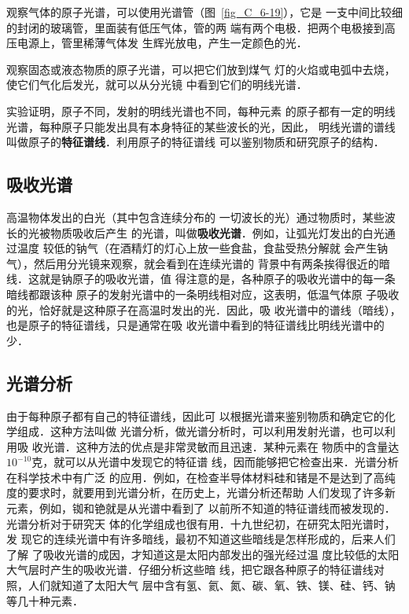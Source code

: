 观察气体的原子光谱，可以使用光谱管（图~\ref{fig_C_6-19}），它是
一支中间比较细的封闭的玻璃管，里面装有低压气体，管的两
端有两个电极．把两个电极接到高压电源上，管里稀薄气体发
生辉光放电，产生一定颜色的光．

观察固态或液态物质的原子光谱，可以把它们放到煤气
灯的火焰或电弧中去烧，使它们气化后发光，就可以从分光镜
中看到它们的明线光谱．

实验证明，原子不同，发射的明线光谱也不同，每种元素
的原子都有一定的明线光谱，每种原子只能发出具有本身特征的某些波长的光，因此，
明线光谱的谱线叫做原子的\textbf{特征谱线}．利用原子的特征谱线
可以鉴别物质和研究原子的结构．

\subsection{吸收光谱}
高温物体发出的白光（其中包含连续分布的
一切波长的光）通过物质时，某些波长的光被物质吸收后产生
的光谱，叫做\textbf{吸收光谱}．例如，让弧光灯发出的白光通过温度
较低的钠气（在酒精灯的灯心上放一些食盐，食盐受热分解就
会产生钠气），然后用分光镜来观察，就会看到在连续光谱的
背景中有两条挨得很近的暗线．这就是钠原子的吸收光谱，值
得注意的是，各种原子的吸收光谱中的每一条暗线都跟该种
原子的发射光谱中的一条明线相对应，这表明，低温气体原
子吸收的光，恰好就是这种原子在高温时发出的光．因此，吸
收光谱中的谱线（暗线），也是原子的特征谱线，只是通常在吸
收光谱中看到的特征谱线比明线光谱中的少．

\subsection{光谱分析}

由于每种原子都有自己的特征谱线，因此可
以根据光谱来鉴别物质和确定它的化学组成．这种方法叫做
光谱分析，做光谱分析时，可以利用发射光谱，也可以利用吸
收光谱．这种方法的优点是非常灵敏而且迅速．某种元素在
物质中的含量达$10^{-10}$克，就可以从光谱中发现它的特征谱
线，因而能够把它检查出来．光谱分析在科学技术中有广泛
的应用．例如，在检查半导体材料硅和锗是不是达到了高纯
度的要求时，就要用到光谱分析，在历史上，光谱分析还帮助
人们发现了许多新元素，例如，铷和铯就是从光谱中看到了
以前所不知道的特征谱线而被发现的．光谱分析对于研究天
体的化学组成也很有用．十九世纪初，在研究太阳光谱时，发
现它的连续光谱中有许多暗线，最初不知道这些暗线是怎样形成的，后来人们了解
了吸收光谱的成因，才知道这是太阳内部发出的强光经过温
度比较低的太阳大气层时产生的吸收光谱．仔细分析这些暗
线，把它跟各种原子的特征谱线对照，人们就知道了太阳大气
层中含有氢、氦、氮、碳、氧、铁、镁、硅、钙、钠等几十种元素．


